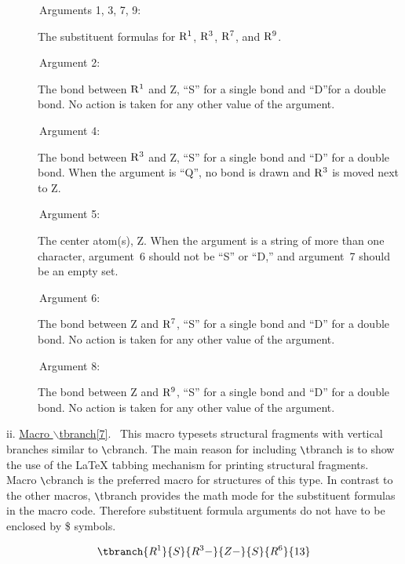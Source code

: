  \begin{description}
  \item[{\rm \ \ \ \ \ \ Arguments 1, 3, 7, 9: }] The substituent formulas for 
                  ${\rm R^1}$, ${\rm R^3}$, ${\rm R^7}$, and
                  ${\rm R^9}$.
  \item[{\rm \ \ \ \ \ \ Argument 2: }] The bond between ${\rm R^1}$ and Z, 
                  ``S'' for a single bond and ``D''for a double
                  bond. No action is taken for any other value of
                  the argument.
  \item[{\rm \ \ \ \ \ \ Argument 4: }] The bond between ${\rm R^3}$ and Z,
                 ``S'' for a single bond and ``D'' for a double
                 bond. When the argument is ``Q'', no bond is
                 drawn and ${\rm R^3}$ is moved next to Z.
  \item[{\rm \ \ \ \ \ \ Argument 5: }] The center atom(s), Z. When the argument is 
                 a string of more than one character, argument~6
                 should not be ``S'' or ``D,'' and argument~7
                 should be an empty set.
 \newpage
  \item[{\rm \ \ \ \ \ \ Argument 6: }] The bond between Z and ${\rm R^7}$,
                 ``S'' for a single bond and ``D'' for a double
                 bond. No action is taken for any other value
                 of the argument.
  \item[{\rm \ \ \ \ \ \ Argument 8:} ] The bond between Z and ${\rm R^9}$,
                 ``S'' for a single bond and ``D'' for a double
                 bond. No action is taken for any other value
                 of the argument.
 \end{description}
  
 \vspace{\len mm}
 \indent ii. \underline{Macro $\backslash $tbranch[7]}. \ 
 This macro typesets structural fragments with vertical branches
 similar to \verb+\+cbranch. The main reason for including
 \verb+\+tbranch is to show the use of the LaTeX tabbing
 mechanism for printing structural fragments.
 Macro \verb+\+cbranch is the preferred macro for structures
 of this type.  In contrast to the other macros, \verb+\+tbranch
 provides the math mode for the substituent formulas in the
 macro code. Therefore substituent formula arguments do not
 have to be enclosed by \$ symbols.

 \[ \tbranch{R^1}{S}{R^3-}{Z-}{S}{R^6}{13}  \]

